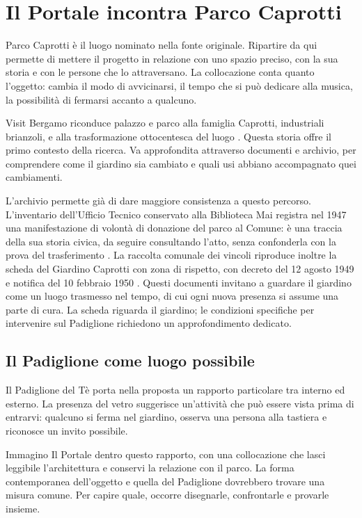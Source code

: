 \section{Il Portale incontra Parco Caprotti}\label{sec:caprotti}

Parco Caprotti è il luogo nominato nella fonte originale.
Ripartire da qui permette di mettere il progetto in relazione
con uno spazio preciso, con la sua storia e con le persone
che lo attraversano. La collocazione conta quanto l'oggetto:
cambia il modo di avvicinarsi, il tempo che si può dedicare
alla musica, la possibilità di fermarsi accanto a qualcuno.

Visit Bergamo riconduce palazzo e parco alla famiglia Caprotti,
industriali brianzoli, e alla trasformazione ottocentesca del
luogo \cite{visit_protestanti}. Questa storia offre il primo
contesto della ricerca. Va approfondita attraverso documenti
e archivio, per comprendere come il giardino sia cambiato
e quali usi abbiano accompagnato quei cambiamenti.

L'archivio permette già di dare maggiore consistenza a questo percorso.
L'inventario dell'Ufficio Tecnico conservato alla Biblioteca Mai
registra nel 1947 una manifestazione di volontà di donazione del
parco al Comune: è una traccia della sua storia civica, da seguire
consultando l'atto, senza confonderla con la prova del trasferimento
\cite[p.~44 PDF, doc.~1435, faldone~16]{mai_inventario}.
La raccolta comunale dei vincoli riproduce inoltre la scheda del
Giardino Caprotti con zona di rispetto, con decreto del 12 agosto 1949
e notifica del 10 febbraio 1950
\cite[p.~176 PDF, vincolo~118]{bergamo_vincolo118}.
Questi documenti invitano a guardare il giardino come un luogo
trasmesso nel tempo, di cui ogni nuova presenza si assume una parte
di cura. La scheda riguarda il giardino; le condizioni specifiche
per intervenire sul Padiglione richiedono un approfondimento dedicato.

\subsection{Il Padiglione come luogo possibile}
Il Padiglione del Tè porta nella proposta un rapporto
particolare tra interno ed esterno. La presenza del vetro
suggerisce un'attività che può essere vista prima di entrarvi:
qualcuno si ferma nel giardino, osserva una persona alla
tastiera e riconosce un invito possibile.

Immagino Il Portale dentro questo rapporto, con una
collocazione che lasci leggibile l'architettura e conservi
la relazione con il parco. La forma contemporanea
dell'oggetto e quella del Padiglione dovrebbero trovare
una misura comune. Per capire quale, occorre disegnarle,
confrontarle e provarle insieme.

